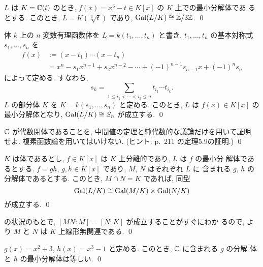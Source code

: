 \documentclass[12pt,twoside]{jarticle}
\begin{document}
\begin{question}
  $L$ は $K={\mathbb C}(t)$ のとき, $f(x)=x^3-t\in K[x]$ の $K$ 上での最小分解体であ
  るとする.
  このとき, $L=K(\sqrt[3]{t})$ であり, $\mathop{\mathrm{Gal}}\nolimits(L/K)\cong{\mathbb Z}/3{\mathbb Z}$. \qed
\end{question}

\begin{question}
  体 $k$ 上の $n$ 変数有理函数体を $L=k(t_1,\ldots,t_n)$ と書き,
  $t_1,\ldots,t_n$ の基本対称式 $s_1,\ldots,s_n$ を
  \begin{align*}
    f(x) &:= (x-t_1)\cdots(x-t_n)
    \\ 
    &= x^n - s_1 x^{n-1} + s_2 x^{n-2} - 
    \cdots + (-1)^{n-1}s_{n-1}x + (-1)^n s_n
  \end{align*}
  によって定める.  すなわち, 
  \begin{equation*}
    s_k = \sum_{1\le i_1<\cdots<i_k\le n} t_{i_1}\cdots t_{i_k}.
  \end{equation*}
  $L$ の部分体 $K$ を $K=k(s_1,\ldots,s_n)$ と定める.
  このとき, $L$ は $f(x)\in K[x]$ の最小分解体となり,
  $\mathop{\mathrm{Gal}}\nolimits(L/K)\cong S_n$ が成立する. \qed
\end{question}

\begin{question}
  ${\mathbb C}$ が代数閉体であることを, 中間値の定理と純代数的な議論だけを用いて証明
  せよ. 複素函数論を用いてはいけない.
  (ヒント: \cite{morita} p.~211 の定理5.9の証明.)
  \qed
\end{question}

\begin{question}\label{q:GalxGal}
  $K$ は体であるとし, $f\in K[x]$ は $K$ 上分離的であり, $L$ は $f$ の最小分
  解体であるとする. $f=gh$, $g,h\in K[x]$ であり, $M$, $N$ はそれぞれ $L$ に
  含まれる $g$, $h$ の分解体であるとする.  このとき, $M\cap  N=K$ であれば, 
  同型
  \begin{equation*}
    \mathop{\mathrm{Gal}}\nolimits(L/K) \cong \mathop{\mathrm{Gal}}\nolimits(M/K)\times\mathop{\mathrm{Gal}}\nolimits(N/K)
  \end{equation*}
  が成立する. \qed
\end{question}

\begin{rem}
   の状況のもとで, $[MN:M]=[N:K]$ が成立することがすぐにわか
  るので,  より $M$ と $N$ は $K$ 上線形無関連である. \qed
\end{rem}

\begin{question}
  $g(x)=x^2+3$, $h(x)=x^3-1$ と定める.  このとき, ${\mathbb C}$ に含まれる $g$ の分解
  体と $h$ の最小分解体は等しい.  \qed
\end{question}
\end{document}
